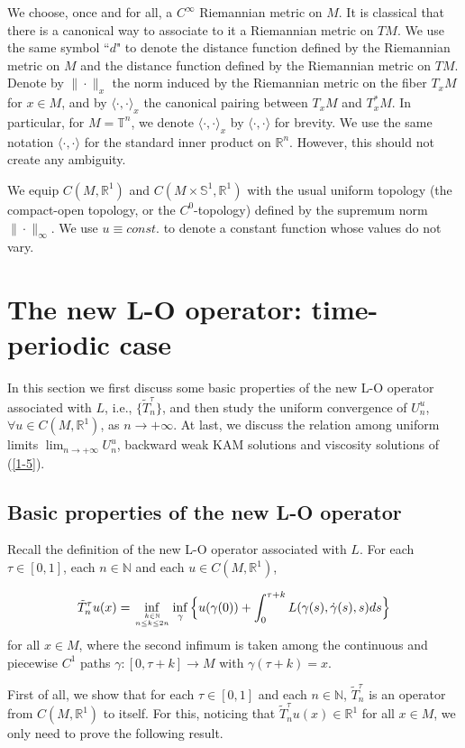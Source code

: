 \documentclass{amsart}[12pt]
\theoremstyle{definition}
\theoremstyle{remark}
\numberwithin{equation}{section}
\begin{document}
We choose, once and for all, a $C^\infty$ Riemannian metric on
$M$. It is classical that there is a canonical way to associate to
it a Riemannian metric on $TM$. We use the same symbol ``$d$" to
denote the distance function defined by the Riemannian metric on
$M$ and the distance function defined by the Riemannian metric on
$TM$. Denote by $\|\cdot\|_x$ the norm induced by the Riemannian
metric on the fiber $T_xM$ for $x\in M$, and by $\langle
\cdot,\cdot\rangle_x$ the canonical pairing between $T_xM$ and
$T_x^*M$. In particular, for $M=\mathbb{T}^n$, we denote $\langle
\cdot,\cdot\rangle_x$ by $\langle \cdot,\cdot\rangle$ for brevity.
We use the same notation $\langle \cdot,\cdot\rangle$ for the
standard inner product on $\mathbb{R}^n$. However, this should not
create any ambiguity.

We equip $C(M,\mathbb{R}^1)$ and
$C(M\times\mathbb{S}^1,\mathbb{R}^1)$ with the usual uniform
topology (the compact-open topology, or the $C^0$-topology)
defined by the supremum norm $\|\cdot\|_\infty$. We use $u\equiv
const.$ to denote a constant function whose values do not vary.

\section{The new L-O operator: time-periodic case}
In this section we first discuss some basic properties of the new
L-O operator associated with $L$, i.e., $\{\tilde{T}_n^\tau\}$,
and then study the uniform convergence of $U_n^u$, $\forall u\in
C(M,\mathbb{R}^1)$, as $n\to+\infty$. At last, we discuss the
relation among uniform limits $\lim_{n\to+\infty}U^u_n$, backward
weak KAM solutions and viscosity solutions of (\ref{1-5}).

\subsection{Basic properties of the new L-O operator}
Recall the definition of the new L-O operator associated with $L$.
For each $\tau\in[0,1]$, each $n\in \mathbb{N}$ and each $u\in
C(M,\mathbb{R}^1)$,

\[
\tilde{T}_n^\tau u(x)=\inf_{k\in\mathbb{N} \atop n\leq k\leq
2n}\inf_{\gamma}\Big\{u(\gamma(0))+\int_{0}^{\tau+k}
L(\gamma(s),\dot{\gamma}(s),s)ds\Big\}
\]
for all $x\in M$, where the second infimum is taken among the
continuous and piecewise $C^1$ paths $\gamma:[0,\tau+k]\rightarrow
M$ with $\gamma(\tau+k)=x$.

First of all, we show that for each $\tau\in[0,1]$ and each
$n\in\mathbb{N}$, $\tilde{T}_n^\tau$ is an operator from
$C(M,\mathbb{R}^1)$ to itself. For this, noticing that
$\tilde{T}_n^\tau u(x)\in\mathbb{R}^1$ for all $x\in M$, we only
need to prove the following result.
\end{document}
